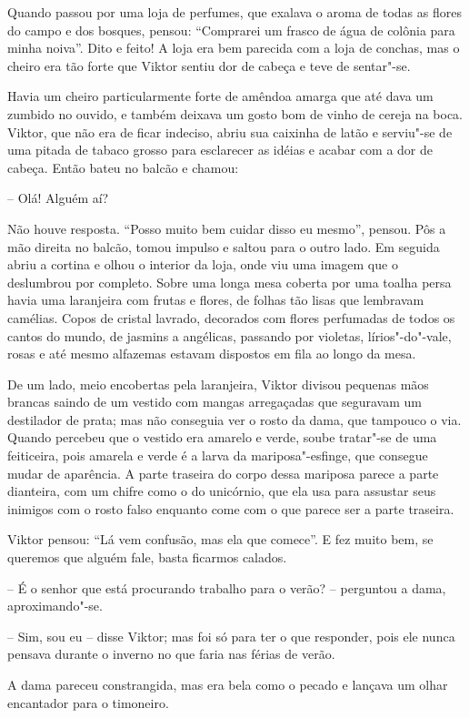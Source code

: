 Quando passou por uma loja de perfumes, que exalava o aroma de todas as
flores do campo e dos bosques, pensou: ``Comprarei um frasco de água
de colônia para minha noiva''. Dito e feito! A loja era bem parecida com
a loja de conchas, mas o cheiro era tão forte que Viktor sentiu dor de
cabeça e teve de sentar"-se. 

Havia um cheiro particularmente forte de amêndoa amarga que até dava 
um zumbido no ouvido, e também deixava um gosto bom de vinho de cereja na boca. 
Viktor, que não era de ficar indeciso, abriu sua caixinha de latão e 
serviu"-se de uma pitada de tabaco grosso para esclarecer as idéias e 
acabar com a dor de cabeça. Então bateu no balcão e chamou:

-- Olá! Alguém aí?

Não houve resposta. ``Posso muito bem cuidar disso eu mesmo'', pensou. Pôs
a mão direita no balcão, tomou impulso e saltou para o outro lado. Em
seguida abriu a cortina e olhou o interior da loja, onde viu uma imagem
que o deslumbrou por completo. Sobre uma longa mesa coberta por uma
toalha persa havia uma laranjeira com frutas e flores, de folhas tão
lisas que lembravam camélias. Copos de cristal lavrado, decorados com
flores perfumadas de todos os cantos do mundo, de jasmins a angélicas,
passando por violetas, lírios"-do"-vale, rosas e até mesmo alfazemas
estavam dispostos em fila ao longo da mesa. 

De um lado, meio encobertas
pela laranjeira, Viktor divisou pequenas mãos brancas saindo de um
vestido com mangas arregaçadas que seguravam um destilador de prata;
mas não conseguia ver o rosto da dama, que tampouco o via. Quando
percebeu que o vestido era amarelo e verde, soube tratar"-se de uma
feiticeira, pois amarela e verde é a larva da mariposa"-esfinge, que
consegue mudar de aparência. A parte traseira do corpo dessa mariposa
parece a parte dianteira, com um chifre como o do unicórnio, que ela
usa para assustar seus inimigos com o rosto falso enquanto come com o
que parece ser a parte traseira.

Viktor pensou: ``Lá vem confusão, mas ela que comece''. E fez muito bem,
se queremos que alguém fale, basta ficarmos calados.

-- É o senhor que está procurando trabalho para o verão? -- perguntou a
dama, aproximando"-se.

 -- Sim, sou eu -- disse Viktor; mas foi só para ter o que responder, pois
ele nunca pensava durante o inverno no que faria nas férias de verão. 

 A dama pareceu constrangida, mas era bela como o pecado e lançava um
olhar encantador para o timoneiro.

